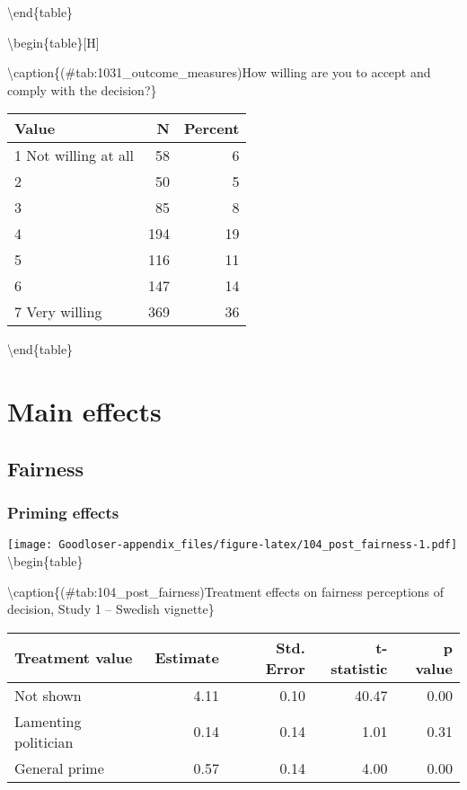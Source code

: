 \documentclass[
]{book}
\begin{document}
\textbackslash end\{table\}

\textbackslash begin\{table\}{[}H{]}

\textbackslash caption\{(\#tab:1031\_outcome\_measures)How willing are you to accept and comply with the decision?\}
\centering

\begin{tabular}[t]{lrr}
\toprule
Value & N & Percent\\
\midrule
1 Not willing at all & 58 & 6\\
2 & 50 & 5\\
3 & 85 & 8\\
4 & 194 & 19\\
5 & 116 & 11\\
6 & 147 & 14\\
7 Very willing & 369 & 36\\
\bottomrule
\end{tabular}

\textbackslash end\{table\}

\hypertarget{main-effects}{%
\chapter{Main effects}\label{main-effects}}

\hypertarget{fairness}{%
\section{Fairness}\label{fairness}}

\hypertarget{priming-effects}{%
\subsection{Priming effects}\label{priming-effects}}

\texttt{[image: Goodloser-appendix\_files/figure-latex/104\_post\_fairness-1.pdf]} \textbackslash begin\{table\}

\textbackslash caption\{(\#tab:104\_post\_fairness)Treatment effects on fairness perceptions of decision, Study 1 -- Swedish vignette\}
\centering

\begin{tabular}[t]{lrrrr}
\toprule
Treatment value & Estimate & Std. Error & t-statistic & p value\\
\midrule
Not shown & 4.11 & 0.10 & 40.47 & 0.00\\
Lamenting politician & 0.14 & 0.14 & 1.01 & 0.31\\
General prime & 0.57 & 0.14 & 4.00 & 0.00\\
\bottomrule
\end{tabular}
\end{document}
